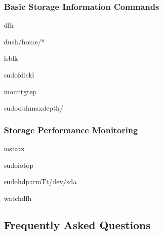 \documentclass[letterpaper,10pt,english]{sphinxmanual}
\begin{document}
\subsubsection{Basic Storage Information Commands}
\label{\detokenize{storage-overview:basic-storage-information-commands}}
\begin{sphinxVerbatim}[commandchars=\\\{\}]
df\PYGZhy{}h

du\PYGZhy{}sh/home/*

lsblk

sudofdisk\PYGZhy{}l

mountgrep

sudodu\PYGZhy{}h\PYGZhy{}\PYGZhy{}max\PYGZhy{}depth/
\end{sphinxVerbatim}


\subsubsection{Storage Performance Monitoring}
\label{\detokenize{storage-overview:storage-performance-monitoring}}
\begin{sphinxVerbatim}[commandchars=\\\{\}]
iostat\PYGZhy{}x

sudoiotop

sudohdparm\PYGZhy{}Tt/dev/sda

watchdf\PYGZhy{}h
\end{sphinxVerbatim}


\subsection{Frequently Asked Questions}
\label{\detokenize{storage-overview:frequently-asked-questions}}
\end{document}
